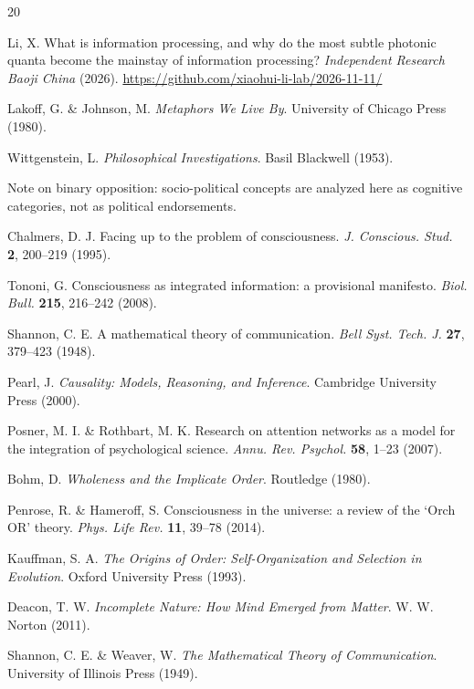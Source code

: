 \documentclass[11pt,a4paper]{article}
\begin{document}
\begin{thebibliography}{20}

Li, X. What is information processing, and why do the most subtle photonic quanta become the mainstay of information processing? \textit{Independent Research Baoji China} (2026). \url{https://github.com/xiaohui-li-lab/2026-11-11/}

Lakoff, G. \& Johnson, M. \textit{Metaphors We Live By}. University of Chicago Press (1980).

Wittgenstein, L. \textit{Philosophical Investigations}. Basil Blackwell (1953).

Note on binary opposition: socio-political concepts are analyzed here as cognitive categories, not as political endorsements.

Chalmers, D. J. Facing up to the problem of consciousness. \textit{J. Conscious. Stud.} \textbf{2}, 200--219 (1995).

Tononi, G. Consciousness as integrated information: a provisional manifesto. \textit{Biol. Bull.} \textbf{215}, 216--242 (2008).

Shannon, C. E. A mathematical theory of communication. \textit{Bell Syst. Tech. J.} \textbf{27}, 379--423 (1948).

Pearl, J. \textit{Causality: Models, Reasoning, and Inference}. Cambridge University Press (2000).

Posner, M. I. \& Rothbart, M. K. Research on attention networks as a model for the integration of psychological science. \textit{Annu. Rev. Psychol.} \textbf{58}, 1--23 (2007).

Bohm, D. \textit{Wholeness and the Implicate Order}. Routledge (1980).

Penrose, R. \& Hameroff, S. Consciousness in the universe: a review of the `Orch OR' theory. \textit{Phys. Life Rev.} \textbf{11}, 39--78 (2014).

Kauffman, S. A. \textit{The Origins of Order: Self-Organization and Selection in Evolution}. Oxford University Press (1993).

Deacon, T. W. \textit{Incomplete Nature: How Mind Emerged from Matter}. W. W. Norton (2011).

Shannon, C. E. \& Weaver, W. \textit{The Mathematical Theory of Communication}. University of Illinois Press (1949).


\end{thebibliography}
\end{document}
